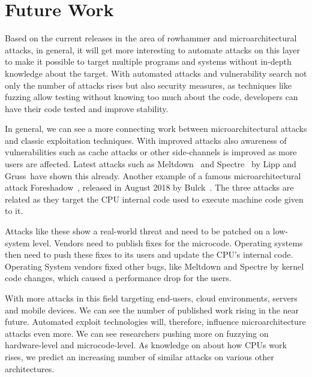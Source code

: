 \chapter{Future Work}\label{sec:futurework}

Based on the current releases in the area of rowhammer and microarchitectural
attacks, in general, it will get more interesting to automate attacks on this
layer to make it possible to target multiple programs and systems without
in-depth knowledge about the target. With automated attacks and vulnerability
search not only the number of attacks rises but also security measures, as
techniques like fuzzing allow testing without knowing too much about the code,
developers can have their code tested and improve stability.

In general, we can see a more connecting work between microarchitectural attacks
and classic exploitation techniques. With improved attacks also awareness of
vulnerabilities such as cache attacks or other side-channels is improved as more
users are affected. Latest attacks such as Meltdown~\cite{meltdown} and
Spectre~\cite{spectre} by Lipp and Gruss~\etal have shown this already. Another
example of a famous microarchitectural attack Foreshadow~\cite{foreshadow},
released in August 2018 by Bulck~\etal. The three attacks are related as they
target the CPU internal code used to execute machine code given to it.


Attacks like these show a real-world threat and need to be patched on a
low-system level. Vendors need to publish fixes for the microcode. Operating
systems then need to push these fixes to its users and update the CPU's internal
code. Operating System vendors fixed other bugs, like Meltdown and Spectre by
kernel code changes, which caused a performance drop for the users.

With more attacks in this field targeting end-users, cloud environments, servers
and mobile devices. We can see the number of published work rising in the near
future. Automated exploit technologies will, therefore, influence
microarchitecture attacks even more. We can see researchers pushing more on
fuzzying on hardware-level and microcode-level. As knowledge on about how CPUs
work rises, we predict an increasing number of similar attacks on various other
architectures.


